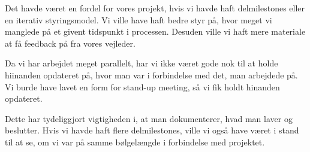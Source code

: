 Det havde været en fordel for vores projekt, hvis vi havde haft delmilestones eller en iterativ styringsmodel. Vi ville have haft bedre styr på, hvor meget vi manglede på et givent tidspunkt i processen. Desuden ville vi haft mere materiale at få feedback på fra vores vejleder.

Da vi har arbejdet meget parallelt, har vi ikke været gode nok til at holde hiinanden opdateret på, hvor man var i forbindelse med det, man arbejdede på. Vi burde have lavet en form for stand-up meeting, så vi fik holdt hinanden opdateret.

Dette har tydeliggjort vigtigheden i, at man dokumenterer, hvad man laver og beslutter. Hvis vi havde haft flere delmilestones, ville vi også have været i stand til at se, om vi var på samme bølgelængde i forbindelse med projektet.